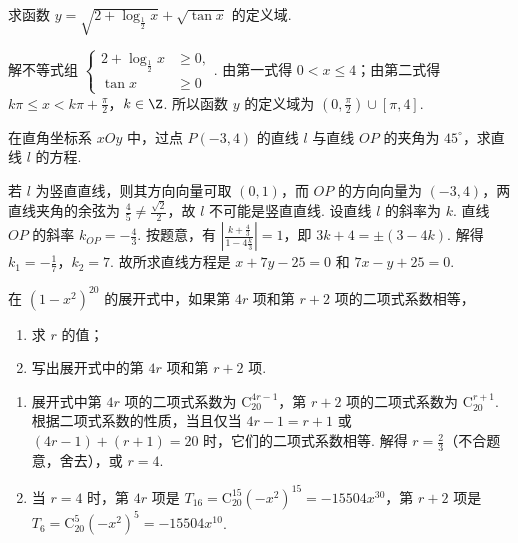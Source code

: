 \begin{problem}
求函数 \(y=\sqrt{2+\log_{\frac{1}{2}}x}+\sqrt{\tan x}\) 的定义域.
\end{problem}

\begin{solution}
解不等式组 \(\left\{\begin{aligned}2+\log_{\frac{1}{2}}x&\geqslant 0,\\ \tan x&\geqslant 0\end{aligned}\right.\). 由第一式得 \(0<x\leqslant 4\)；由第二式得 \(k\pi\leqslant x<k\pi+\frac{\pi}{2}\)，\(k\in\Z\). 所以函数 \(y\) 的定义域为 \(\left( 0,\frac{\pi}{2} \right)\cup [\pi,4]\).
\end{solution}

\begin{problem}
在直角坐标系 \(xOy\) 中，过点 \(P(-3,4)\) 的直线 \(l\) 与直线 \(OP\) 的夹角为 \(45^\circ\)，求直线 \(l\) 的方程.
\end{problem}

\begin{solution}
若 \(l\) 为竖直直线，则其方向向量可取 \((0,1)\)，而 \(OP\) 的方向向量为 \((-3,4)\)，两直线夹角的余弦为 \(\frac{4}{5}\ne\frac{\sqrt{2}}{2}\)，故 \(l\) 不可能是竖直直线. 设直线 \(l\) 的斜率为 \(k\). 直线 \(OP\) 的斜率 \(k_{OP}=-\frac{4}{3}\). 按题意，有 \(\left| \frac{k+\frac{4}{3}}{1-4\frac{k}{3}} \right|=1\)，即 \(3k+4=\pm(3-4k)\). 解得 \(k_1=-\frac{1}{7}\)，\(k_2=7\). 故所求直线方程是 \(x+7y-25=0\) 和 \(7x-y+25=0\).
\end{solution}

\begin{problem}
在 \((1-x^2)^{20}\) 的展开式中，如果第 \(4r\) 项和第 \(r+2\) 项的二项式系数相等，
\begin{enumerate}
\item 求 \(r\) 的值；
\item 写出展开式中的第 \(4r\) 项和第 \(r+2\) 项.
\end{enumerate}
\end{problem}

\begin{solution}
\begin{enumerate}
\item 展开式中第 \(4r\) 项的二项式系数为 \(\mathrm C_{20}^{4r-1}\)，第 \(r+2\) 项的二项式系数为 \(\mathrm C_{20}^{r+1}\). 根据二项式系数的性质，当且仅当 \(4r-1=r+1\) 或 \((4r-1)+(r+1)=20\) 时，它们的二项式系数相等. 解得 \(r=\frac{2}{3}\)（不合题意，舍去），或 \(r=4\).
\item 当 \(r=4\) 时，第 \(4r\) 项是 \(T_{16}=\mathrm C_{20}^{15}\left( -x^2 \right)^{15}=-15504x^{30}\)，第 \(r+2\) 项是 \(T_6=\mathrm C_{20}^5\left( -x^2 \right)^5=-15504x^{10}\).
\end{enumerate}
\end{solution}

